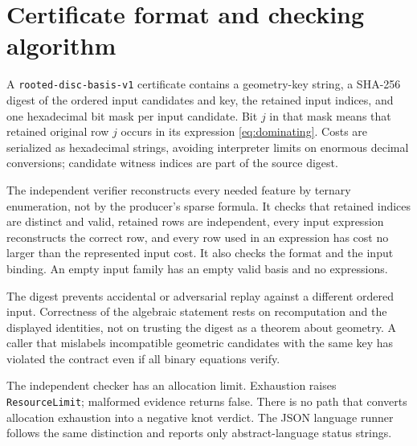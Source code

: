 \documentclass[11pt,letterpaper]{article}
\theoremstyle{definition}
\begin{document}
\section{Certificate format and checking algorithm}\label{app:certificate}
A \texttt{rooted-disc-basis-v1} certificate contains a geometry-key string, a SHA-256 digest of the ordered input candidates and key, the retained input indices, and one hexadecimal bit mask per input candidate. Bit $j$ in that mask means that retained original row $j$ occurs in its expression \eqref{eq:dominating}. Costs are serialized as hexadecimal strings, avoiding interpreter limits on enormous decimal conversions; candidate witness indices are part of the source digest.

The independent verifier reconstructs every needed feature by ternary enumeration, not by the producer's sparse formula. It checks that retained indices are distinct and valid, retained rows are independent, every input expression reconstructs the correct row, and every row used in an expression has cost no larger than the represented input cost. It also checks the format and the input binding. An empty input family has an empty valid basis and no expressions.

The digest prevents accidental or adversarial replay against a different ordered input. Correctness of the algebraic statement rests on recomputation and the displayed identities, not on trusting the digest as a theorem about geometry. A caller that mislabels incompatible geometric candidates with the same key has violated the contract even if all binary equations verify.

The independent checker has an allocation limit. Exhaustion raises \texttt{ResourceLimit}; malformed evidence returns false. There is no path that converts allocation exhaustion into a negative knot verdict. The JSON language runner follows the same distinction and reports only abstract-language status strings.
\end{document}
